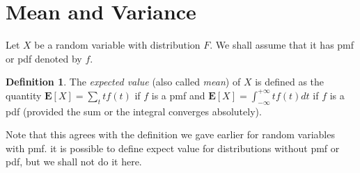 \documentclass[preprint,  11pt]{amsart}
\theoremstyle{plain} %
\theoremstyle{definition} %
\newtheorem{definition}[theorem]{Definition}
\begin{document}
\section{Mean and Variance}
Let $X$ be a random variable with distribution $F$. We shall assume that it has pmf or pdf denoted by $f$. 
\begin{definition} The {\em expected value} (also called {\em mean}) of $X$ is defined as the quantity $\mathbf{E}[X]=\sum_{t}tf(t)$ if $f$ is a pmf and $\mathbf{E}[X]=\int_{-\infty}^{+\infty} t f(t)dt$ if $f$ is a pdf (provided the sum or the integral converges absolutely). \end{definition}
Note that this agrees with the definition we gave earlier for random variables with pmf. it is possible to define expect value for distributions without pmf or pdf, but we shall not do it here.
\end{document}
